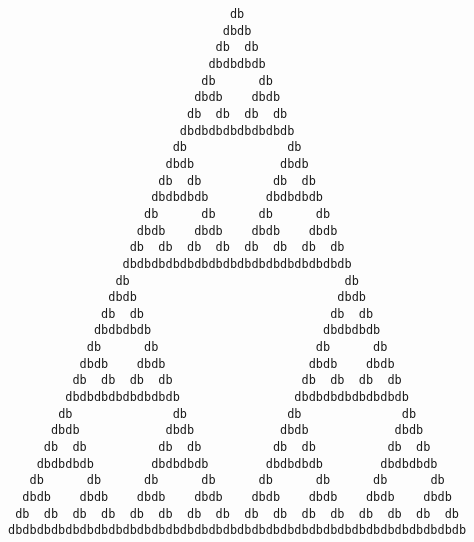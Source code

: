 \documentclass{article}
\begin{document}
\vfill
\centering
\fontsize{5pt}{4.5pt}
\begin{BVerbatim}
                               db
                              dbdb
                             db  db
                            dbdbdbdb
                           db      db
                          dbdb    dbdb
                         db  db  db  db
                        dbdbdbdbdbdbdbdb
                       db              db
                      dbdb            dbdb
                     db  db          db  db
                    dbdbdbdb        dbdbdbdb
                   db      db      db      db
                  dbdb    dbdb    dbdb    dbdb
                 db  db  db  db  db  db  db  db
                dbdbdbdbdbdbdbdbdbdbdbdbdbdbdbdb
               db                              db
              dbdb                            dbdb
             db  db                          db  db
            dbdbdbdb                        dbdbdbdb
           db      db                      db      db
          dbdb    dbdb                    dbdb    dbdb
         db  db  db  db                  db  db  db  db
        dbdbdbdbdbdbdbdb                dbdbdbdbdbdbdbdb
       db              db              db              db
      dbdb            dbdb            dbdb            dbdb
     db  db          db  db          db  db          db  db
    dbdbdbdb        dbdbdbdb        dbdbdbdb        dbdbdbdb
   db      db      db      db      db      db      db      db
  dbdb    dbdb    dbdb    dbdb    dbdb    dbdb    dbdb    dbdb
 db  db  db  db  db  db  db  db  db  db  db  db  db  db  db  db
dbdbdbdbdbdbdbdbdbdbdbdbdbdbdbdbdbdbdbdbdbdbdbdbdbdbdbdbdbdbdbdb
\end{BVerbatim}
\end{document}
